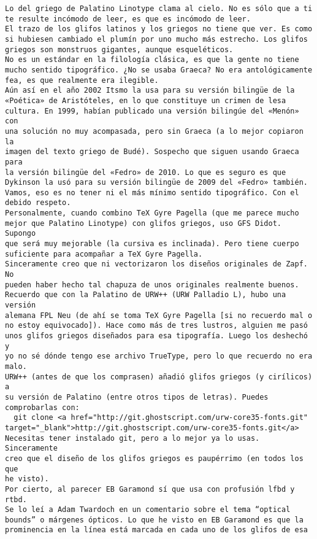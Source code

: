 \documentclass[a4paper,10pt]{article}
\begin{document}
\begin{lstlisting}
Lo del griego de Palatino Linotype clama al cielo. No es sólo que a ti
te resulte incómodo de leer, es que es incómodo de leer.
El trazo de los glifos latinos y los griegos no tiene que ver. Es como
si hubiesen cambiado el plumín por uno mucho más estrecho. Los glifos
griegos son monstruos gigantes, aunque esqueléticos.
No es un estándar en la filología clásica, es que la gente no tiene
mucho sentido tipográfico. ¿No se usaba Graeca? No era antológicamente
fea, es que realmente era ilegible.
Aún así en el año 2002 Itsmo la usa para su versión bilingüe de la
«Poética» de Aristóteles, en lo que constituye un crimen de lesa
cultura. En 1999, habían publicado una versión bilingúe del «Menón» con
una solución no muy acompasada, pero sin Graeca (a lo mejor copiaron la
imagen del texto griego de Budé). Sospecho que siguen usando Graeca para
la versión bilingüe del «Fedro» de 2010. Lo que es seguro es que
Dykinson la usó para su versión bilingüe de 2009 del «Fedro» también.
Vamos, eso es no tener ni el más mínimo sentido tipográfico. Con el
debido respeto.
Personalmente, cuando combino TeX Gyre Pagella (que me parece mucho
mejor que Palatino Linotype) con glifos griegos, uso GFS Didot. Supongo
que será muy mejorable (la cursiva es inclinada). Pero tiene cuerpo
suficiente para acompañar a TeX Gyre Pagella.
Sinceramente creo que ni vectorizaron los diseños originales de Zapf. No
pueden haber hecho tal chapuza de unos originales realmente buenos.
Recuerdo que con la Palatino de URW++ (URW Palladio L), hubo una versión
alemana FPL Neu (de ahí se toma TeX Gyre Pagella [si no recuerdo mal o
no estoy equivocado]). Hace como más de tres lustros, alguien me pasó
unos glifos griegos diseñados para esa tipografía. Luego los deshechó y
yo no sé dónde tengo ese archivo TrueType, pero lo que recuerdo no era malo.
URW++ (antes de que los comprasen) añadió glifos griegos (y cirílicos) a
su versión de Palatino (entre otros tipos de letras). Puedes
comprobarlas con:
  git clone <a href="http://git.ghostscript.com/urw-core35-fonts.git" target="_blank">http://git.ghostscript.com/urw-core35-fonts.git</a>
Necesitas tener instalado git, pero a lo mejor ya lo usas. Sinceramente
creo que el diseño de los glifos griegos es paupérrimo (en todos los que
he visto).
Por cierto, al parecer EB Garamond sí que usa con profusión lfbd y rtbd.
Se lo leí a Adam Twardoch en un comentario sobre el tema “optical
bounds” o márgenes ópticos. Lo que he visto en EB Garamond es que la
prominencia en la línea está marcada en cada uno de los glifos de esa

\end{lstlisting}
\end{document}
